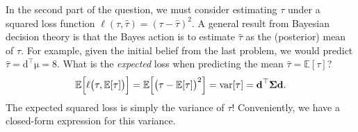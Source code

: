 \documentclass{article}
\newcommand{\trans}{^\top}
\newcommand{\mat}[1]{\bm{\mathrm{#1}}}
\renewcommand{\vec}[1]{\bm{\mathrm{#1}}}
\DeclareMathOperator{\var}{var}
\begin{document}
In the second part of the question, we must consider estimating $\tau$
under a squared loss function $\ell(\tau, \hat{\tau}) = (\tau -
\hat{\tau})^2$.  A general result from Bayesian decision theory is
that the Bayes action is to estimate $\hat{\tau}$ as the (posterior)
mean of $\tau$.  For example, given the initial belief from the last
problem, we would predict $\hat{\tau} = \vec{d}\trans \vec{\mu} = 8$.
What is the \emph{expected} loss when predicting the mean $\hat{\tau}
= \mathbb{E}[\tau]$?
\begin{equation*}
  \mathbb{E}
  \Bigl[
    \ell\bigl(\tau, \mathbb{E}[\tau]\bigr)
  \Bigr]
  =
  \mathbb{E}
  \Bigl[
    \bigl(\tau - \mathbb{E}[\tau]\bigr)^2
  \Bigr]
  =
  \var [ \tau ]
  =
  \vec{d}\trans \mat{\Sigma} \vec{d}.
\end{equation*}
The expected squared loss is simply the variance of $\tau$!  Conveniently,
we have a closed-form expression for this variance.
\end{document}
